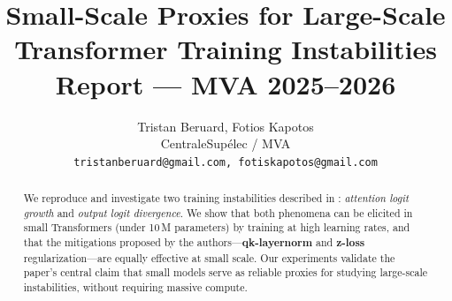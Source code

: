 \documentclass{article}
\title{%
  Small-Scale Proxies for Large-Scale\\
  Transformer Training Instabilities\\[0.3em]
  \large Report --- MVA 2025--2026
}
\author{
  Tristan Beruard, Fotios Kapotos\\
  CentraleSupélec / MVA\\
  \texttt{tristanberuard@gmail.com, fotiskapotos@gmail.com}
}
\begin{document}
\maketitle

\begin{abstract}
We reproduce and investigate two training instabilities described in
\citet{wortsman2023smallscale}: \emph{attention logit growth} and
\emph{output logit divergence}.
We show that both phenomena can be elicited in small Transformers
(under 10\,M parameters) by training at high learning rates, and that the
mitigations proposed by the authors---\textbf{qk-layernorm} and
\textbf{z-loss} regularization---are equally effective at small scale.
Our experiments validate the paper's central claim that small models serve as
reliable proxies for studying large-scale instabilities, without requiring
massive compute.
\end{abstract}






% 
% 



\end{document}
